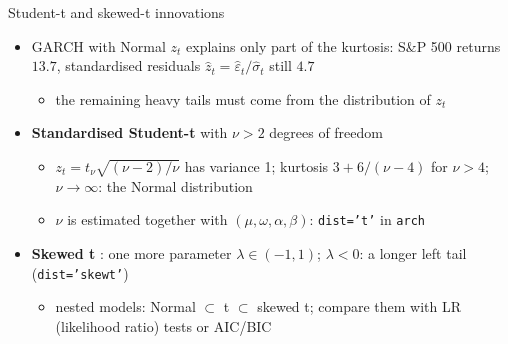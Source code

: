 \begin{frame}{Student-t and skewed-t innovations}
\itemsize{\small}
\begin{itemize}
    \item GARCH with Normal $z_t$ explains only part of the kurtosis: S\&P 500 returns $13.7$, standardised residuals $\hat z_t = \hat\varepsilon_t/\hat\sigma_t$ still $4.7$
    \begin{itemize}
        \item the remaining heavy tails must come from the distribution of $z_t$
    \end{itemize}
    \item \textbf{Standardised Student-t} with $\nu > 2$ degrees of freedom 
    \begin{itemize}
        \item $z_t = t_\nu\sqrt{(\nu - 2)/\nu}$ has variance 1; kurtosis $3 + 6/(\nu - 4)$ for $\nu > 4$; $\nu \to \infty$: the Normal distribution
        \item $\nu$ is estimated together with $(\mu, \omega, \alpha, \beta)$: \texttt{dist='t'} in \texttt{arch}
    \end{itemize}
    \item \textbf{Skewed t} : one more parameter $\lambda \in (-1, 1)$; $\lambda < 0$: a longer left tail (\texttt{dist='skewt'})
    \begin{itemize}
        \item nested models: Normal $\subset$ t $\subset$ skewed t; compare them with LR (likelihood ratio) tests or AIC/BIC
    \end{itemize}
\end{itemize}
\end{frame}

